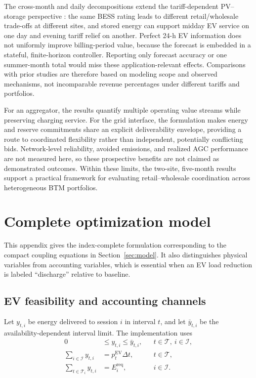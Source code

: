 \documentclass[final,5p,times]{elsarticle}
\newcommand{\dt}{\Delta t}
\newcommand{\EV}{\mathrm{EV}}
\newcommand{\req}{\mathrm{req}}
\newcommand{\calT}{\mathcal{T}}
\newcommand{\calI}{\mathcal{I}}
\begin{document}
The cross-month and daily decompositions extend the tariff-dependent
PV--storage perspective \cite{boampong2020retail}: the same BESS rating leads
to different retail/wholesale trade-offs at different sites, and stored energy
can support midday EV service on one day and evening tariff relief on another.
Perfect 24-h EV information does not uniformly improve billing-period value,
because the forecast is embedded in a stateful, finite-horizon controller.
Reporting only forecast accuracy or one summer-month total would miss these
application-relevant effects. Comparisons with prior studies are therefore
based on modeling scope and observed mechanisms, not incomparable revenue
percentages under different tariffs and portfolios.

For an aggregator, the results quantify multiple operating value streams while
preserving charging service. For the grid interface, the formulation makes
energy and reserve commitments share an explicit deliverability envelope,
providing a route to coordinated flexibility rather than independent,
potentially conflicting bids. Network-level reliability, avoided emissions,
and realized AGC performance are not measured here, so these prospective
benefits are not claimed as demonstrated outcomes. Within these limits, the
two-site, five-month results support a practical framework for evaluating
retail--wholesale coordination across heterogeneous BTM portfolios.

\appendix

\section{Complete optimization model}
\label{app:complete_model}

This appendix gives the index-complete formulation corresponding to the compact
coupling equations in Section~\ref{sec:model}. It also distinguishes physical
variables from accounting variables, which is essential when an EV load
reduction is labeled ``discharge'' relative to baseline.

\subsection{EV feasibility and accounting channels}
Let $y_{t,i}$ be energy delivered to session $i$ in interval $t$, and let
$\bar y_{t,i}$ be the availability-dependent interval limit. The implementation
uses
\begin{align}
0&\le y_{t,i}\le \bar y_{t,i}, &&t\in\calT,\ i\in\calI, \label{eq:app_ev_interval}\\
\sum_{i\in\calI}y_{t,i}&=p_t^{\EV}\dt, &&t\in\calT, \label{eq:app_ev_aggregate}\\
\sum_{t\in\calT_i}y_{t,i}&=E_i^{\req}, &&i\in\calI. \label{eq:app_ev_energy}
\end{align}
\end{document}

